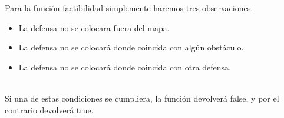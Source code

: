 Para la función factibilidad simplemente haremos tres observaciones. \\
\begin{itemize}
    \item La defensa no se colocara fuera del mapa.
    \item La defensa no se colocará donde coincida con algún obstáculo.
    \item La defensa no se colocará donde coincida con otra defensa.
\end{itemize}\\
Si una de estas condiciones se cumpliera, la función devolverá false, y por el contrario devolverá true.\\
